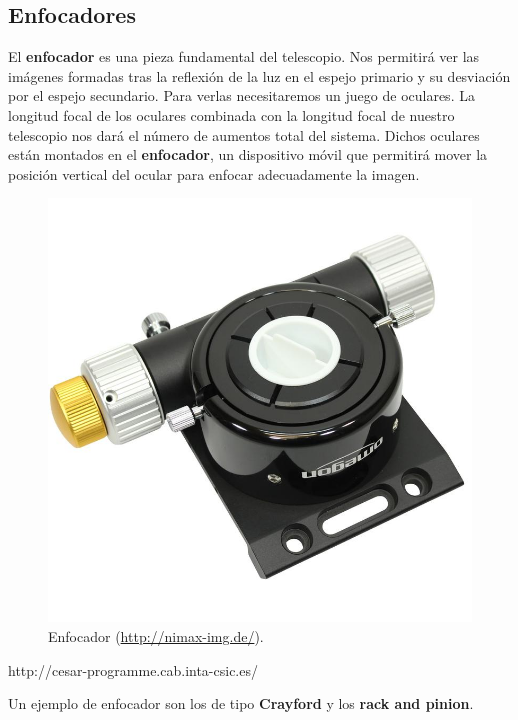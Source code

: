\subsection{Enfocadores}

El \textbf{enfocador} es una pieza fundamental del telescopio. Nos permitirá ver las imágenes formadas tras la reflexión de la luz en el espejo primario y su desviación por el espejo secundario. Para verlas necesitaremos un juego de oculares. La longitud focal de los oculares combinada con la longitud focal de nuestro telescopio nos dará el número de aumentos total del sistema. Dichos oculares están montados en el \textbf{enfocador}, un dispositivo móvil que permitirá mover la posición vertical del ocular para enfocar adecuadamente la imagen.

\bigskip
\begin{figure}[!ht]
  \begin{center}
  \includegraphics[width=1\textwidth]{../images/enfocador.jpg}
  \caption{Enfocador (\url{http://nimax-img.de/}).}
  \label{fig:diag_scrum}
  \end{center}
\end{figure}
http://cesar-programme.cab.inta-csic.es/

\bigskip
Un ejemplo de enfocador son los de tipo \textbf{Crayford} y los \textbf{rack and pinion}.

